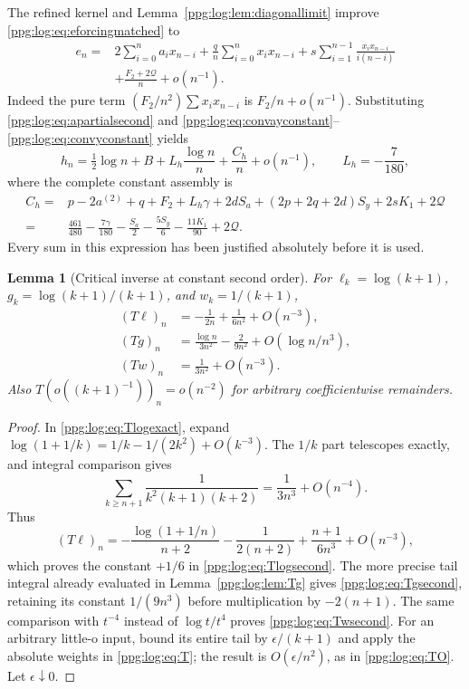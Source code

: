 \documentclass[11pt,letterpaper]{article}
\newtheorem{lemma}[theorem]{Lemma}
\theoremstyle{remark}\newtheorem{remark}[theorem]{Remark}
\numberwithin{equation}{section}
\begin{document}
The refined kernel and Lemma~\ref{ppg:log:lem:diagonallimit} improve \eqref{ppg:log:eq:eforcingmatched} to
\begin{align}\label{ppg:log:eq:eforcingconstant}
 e_n={}&2\sum_{i=0}^na_ix_{n-i}
       +\frac q n\sum_{i=0}^nx_ix_{n-i}
       +s\sum_{i=1}^{n-1}\frac{x_ix_{n-i}}{i(n-i)}\nonumber\\
       &+\frac{F_2+2\mathcal Q}{n}+o(n^{-1}).
\end{align}
Indeed the pure term $(F_2/n^2)\sum x_ix_{n-i}$ is $F_2/n+o(n^{-1})$. Substituting \eqref{ppg:log:eq:apartialsecond} and \eqref{ppg:log:eq:convayconstant}--\eqref{ppg:log:eq:convyconstant} yields
\begin{equation}\label{ppg:log:eq:hfull}
 h_n=\tfrac12\log n+B+L_h\frac{\log n}{n}+\frac{C_h}{n}+o(n^{-1}),
 \qquad L_h=-\frac7{180},
\end{equation}
where the complete constant assembly is
\begin{align}
 C_h={}&p-2a^{(2)}+q+F_2+L_h\gamma
       +2dS_a+(2p+2q+2d)S_y+2sK_1+2\mathcal Q\nonumber\\
 ={}&\frac{461}{480}-\frac{7\gamma}{180}
       -\frac{S_a}2-\frac{5S_y}6-\frac{11K_1}{90}+2\mathcal Q.
 \label{ppg:log:eq:Ch}
\end{align}
Every sum in this expression has been justified absolutely before it is used.

\begin{lemma}[Critical inverse at constant second order]\label{ppg:log:lem:Tsecond}
For $\ell_k=\log(k+1)$, $g_k=\log(k+1)/(k+1)$, and $w_k=1/(k+1)$,
\begin{align}
 (T\ell)_n&=-\frac1{2n}+\frac1{6n^2}+O(n^{-3}),\label{ppg:log:eq:Tlogsecond}\\
 (Tg)_n&=\frac{\log n}{3n^2}-\frac2{9n^2}+O(\log n/n^3),\label{ppg:log:eq:Tgsecond}\\
 (Tw)_n&=\frac1{3n^2}+O(n^{-3}).\label{ppg:log:eq:Twsecond}
\end{align}
Also $T(o((k+1)^{-1}))_n=o(n^{-2})$ for arbitrary coefficientwise remainders.
\end{lemma}
\begin{proof}
In \eqref{ppg:log:eq:Tlogexact}, expand $\log(1+1/k)=1/k-1/(2k^2)+O(k^{-3})$. The $1/k$ part telescopes exactly, and integral comparison gives
\[
 \sum_{k\ge n+1}\frac1{k^2(k+1)(k+2)}=\frac1{3n^3}+O(n^{-4}).
\]
Thus
\[
 (T\ell)_n=-\frac{\log(1+1/n)}{n+2}
       -\frac1{2(n+2)}+\frac{n+1}{6n^3}+O(n^{-3}),
\]
which proves the constant $+1/6$ in \eqref{ppg:log:eq:Tlogsecond}. The more precise tail integral already evaluated in Lemma~\ref{ppg:log:lem:Tg} gives \eqref{ppg:log:eq:Tgsecond}, retaining its constant $1/(9n^3)$ before multiplication by $-2(n+1)$. The same comparison with $t^{-4}$ instead of $\log t/t^4$ proves \eqref{ppg:log:eq:Twsecond}. For an arbitrary little-o input, bound its entire tail by $\epsilon/(k+1)$ and apply the absolute weights in \eqref{ppg:log:eq:T}; the result is $O(\epsilon/n^2)$, as in \eqref{ppg:log:eq:TO}. Let $\epsilon\downarrow0$.
\end{proof}
\end{document}
